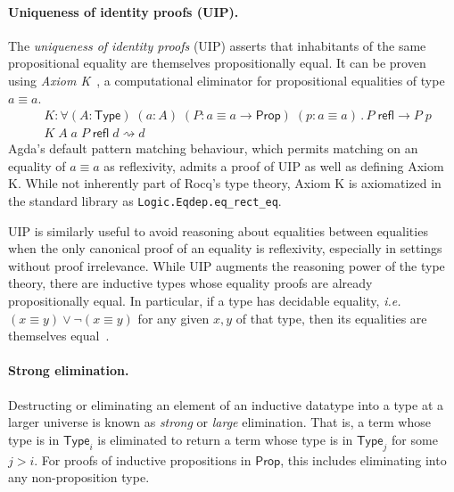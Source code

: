 \documentclass{article}
\makeatletter
\newcommand{\ie}{\textit{i.e.}\@\xspace}
\newcommand{\kw}[1]{\mathsf{#1}}
\newcommand{\code}[1]{\texttt{#1}}
\makeatother
\begin{document}
\paragraph{Uniqueness of identity proofs (UIP).}
The \emph{uniqueness of identity proofs} (UIP)
asserts that inhabitants of the same propositional equality
are themselves propositionally equal.
It can be proven using \emph{Axiom K}~\citep{axiomk},
a computational eliminator for propositional equalities of type $a \equiv a$.
%
\begin{align*}
  &K : \forall (A : \kw{Type}) \; (a : A) \; (P : a \equiv a \to \kw{Prop}) \; (p : a \equiv a) \mathpunct{.}
    P \; \kw{refl} \to P \; p \\
  &K \; A \; a \; P \; \kw{refl} \; d \rightsquigarrow d
\end{align*}
%
Agda's default pattern matching behaviour,
which permits matching on an equality of $a \equiv a$ as reflexivity,
admits a proof of UIP as well as defining Axiom K.
While not inherently part of Rocq's type theory,
Axiom K is axiomatized in the standard library as \code{Logic.Eqdep.eq\_rect\_eq}.

UIP is similarly useful to avoid reasoning about equalities between equalities
when the only canonical proof of an equality is reflexivity,
especially in settings without proof irrelevance.
While UIP augments the reasoning power of the type theory,
there are inductive types whose equality proofs are already propositionally equal.
In particular, if a type has decidable equality,
\ie $(x \equiv y) \vee \neg (x \equiv y)$ for any given $x, y$ of that type,
then its equalities are themselves equal~\citep{hedberg}.

\paragraph{Strong elimination.}
Destructing or eliminating an element of an inductive datatype
into a type at a larger universe is known as \emph{strong} or \emph{large} elimination.
That is, a term whose type is in $\kw{Type}_i$
is eliminated to return a term whose type is in $\kw{Type}_j$
for some $j > i$.
For proofs of inductive propositions in $\kw{Prop}$,
this includes eliminating into any non-proposition type.
\end{document}
